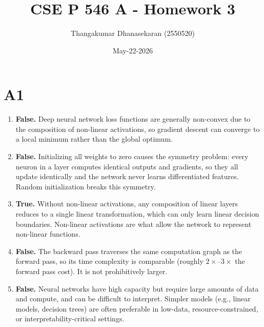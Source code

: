 \documentclass{article}
\title{CSE P 546 A - Homework 3}
\author{Thangakumar Dhanasekaran (2550520)}
\date{May-22-2026}
\begin{document}
\maketitle

\section*{A1}

\begin{enumerate}
  \item[(a)] \textbf{False.} Deep neural network loss functions are generally non-convex due to the composition of non-linear activations, so gradient descent can converge to a local minimum rather than the global optimum.

  \item[(b)] \textbf{False.} Initializing all weights to zero causes the symmetry problem: every neuron in a layer computes identical outputs and gradients, so they all update identically and the network never learns differentiated features. Random initialization breaks this symmetry.

  \item[(c)] \textbf{True.} Without non-linear activations, any composition of linear layers reduces to a single linear transformation, which can only learn linear decision boundaries. Non-linear activations are what allow the network to represent non-linear functions.

  \item[(d)] \textbf{False.} The backward pass traverses the same computation graph as the forward pass, so its time complexity is comparable (roughly $2\times$--$3\times$ the forward pass cost). It is not prohibitively larger.

  \item[(e)] \textbf{False.} Neural networks have high capacity but require large amounts of data and compute, and can be difficult to interpret. Simpler models (e.g., linear models, decision trees) are often preferable in low-data, resource-constrained, or interpretability-critical settings.
\end{enumerate}
\end{document}
